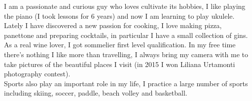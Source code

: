 \documentclass[10pt,a4paper]{altacv}
\begin{document}

I am a passionate and curious guy who loves cultivate its hobbies, I like playing the piano (I took lessons for 6 years) and now I am learning to play ukulele. Lately I have discovered a new passion for cooking, I love making pizza, panettone and preparing cocktails, in particular I have a small collection of gins. As a real wine lover, I got sommelier first level qualification. In my free time there's nothing I like more than travelling, I always bring my camera with me to take pictures of the beautiful places I visit (in 2015 I won Liliana Urtamonti photography contest).\\
Sports also play an important role in my life, I practice a large number of sports including skiing, soccer, paddle, beach volley and basketball. 
\end{document}

